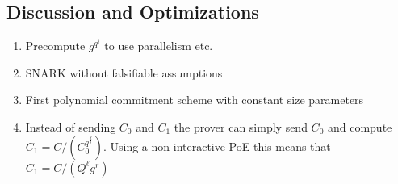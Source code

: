 \documentclass{article}
\begin{document}
\subsection{Discussion and Optimizations}
\begin{enumerate}
	\item Precompute $g^{q^i}$ to use parallelism etc.
	\item SNARK without falsifiable assumptions
	\item First polynomial commitment scheme with constant size parameters
	\item Instead of sending $C_0$ and $C_1$ the prover can simply send $C_0$ and compute $C_1=C/(C_0^{q^{\frac{d}{2}}})$. Using a non-interactive PoE this means that $C_1=C/(Q^{\ell}g^r)$
\end{enumerate}
\end{document}
